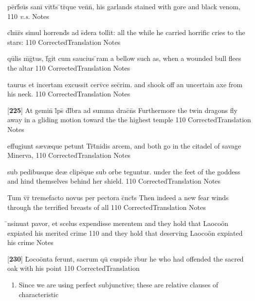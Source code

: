 \latline
  {p\=erf\={}s\=us s\-an\-i\={} v\=itt\={}s \={}tr\={}qu\-e v\-en\={}n\={},}
  { his garlands stained with gore and black venom, }
  {110}
  { \emph{v.s.} }
  { Notes }


\latline
  {cl\={}m\={}r\={}s simul horrend\={}s ad s\={\macron {\i}}dera tollit:}
  { all the while he carried horrific cries to the stars: }
  {110}
  { CorrectedTranslation }
  { Notes }


\latline
  {qu\={}lis m\={}g\={\macron {\i}}tus, f\={}git cum saucius \={}ram}
  { a bellow such as, when a wounded bull flees the altar }
  {110}
  { CorrectedTranslation }
  { Notes }


\latline
  {taurus et incertam excussit cerv\={\macron {\i}}ce sec\={}rim.}
  { and shook off an uncertain axe from his neck.  }
  {110}
  { CorrectedTranslation }
  { Notes }


\latline
  {[\textbf{225}] At gemin\={\macron {\i}} l\={}ps\={} d\={}l\={}bra ad summa drac\={}n\={}s}
  { Furthermore the twin dragons fly away in a gliding motion toward the the highest temple }
  {110}
  { CorrectedTranslation }
  { Notes }


\latline
  {effugiunt s{\ae}v{\ae}que petunt Tr\={\macron {\i}}t\={}nidis arcem,}
  { and both go in the citadel of savage Minerva, }
  {110}
  { CorrectedTranslation }
  { Notes }


\latline
  {sub pedibusque de{\ae} clipe\={\macron {\i}}que sub orbe teguntur.}
  { under the feet of the goddess and hind themselves behind her shield. }
  {110}
  { CorrectedTranslation }
  { Notes }


\latline
  {Tum v\={}r\={} tremefacto novus per pectora c\={}nct\={\macron {\i}}s}
  { Then indeed a new fear winds through the terrified breasts of all }
  {110}
  { CorrectedTranslation }
  { Notes }


\latline
  {\={\macron {\i}}nsinuat pavor, et scelus expendisse merentem}
  { and they hold that Laoco\"on expiated his merited crime  }
  {110}
  { and they hold that deserving Laoco\"on expiated his crime  }
  { Notes }


\latline
  {[\textbf{230}] L\={}oco\"{o}nta ferunt, sacrum qu\={\macron {\i}} cuspide r\={}bur }
  { he who had offended the sacred oak with his point }
  {110}
  { CorrectedTranslation }
  { \begin{enumerate}
  	\item Since we are using perfect subjunctive; these are relative clauses of characteristic
  \end{enumerate} }


